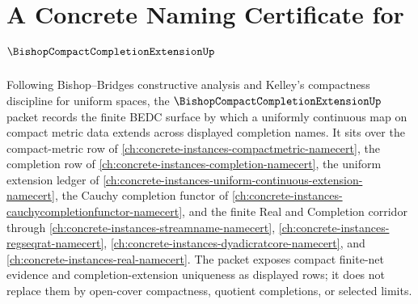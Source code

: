 \chapter{A Concrete Naming Certificate for $\BishopCompactCompletionExtensionUp$}
\label{ch:concrete-instances-bishop-compact-completion-extension-namecert}

Following Bishop--Bridges constructive analysis and Kelley's compactness
discipline for uniform spaces, the $\BishopCompactCompletionExtensionUp$
packet records the finite BEDC surface by which a uniformly continuous map on
compact metric data extends across displayed completion names. It sits over the
compact-metric row of \autoref{ch:concrete-instances-compactmetric-namecert},
the completion row of \autoref{ch:concrete-instances-completion-namecert}, the
uniform extension ledger of
\autoref{ch:concrete-instances-uniform-continuous-extension-namecert}, the
Cauchy completion functor of
\autoref{ch:concrete-instances-cauchycompletionfunctor-namecert}, and the
finite Real and Completion corridor through
\autoref{ch:concrete-instances-streamname-namecert},
\autoref{ch:concrete-instances-regseqrat-namecert},
\autoref{ch:concrete-instances-dyadicratcore-namecert}, and
\autoref{ch:concrete-instances-real-namecert}. The packet exposes compact
finite-net evidence and completion-extension uniqueness as displayed rows; it
does not replace them by open-cover compactness, quotient completions, or
selected limits.


